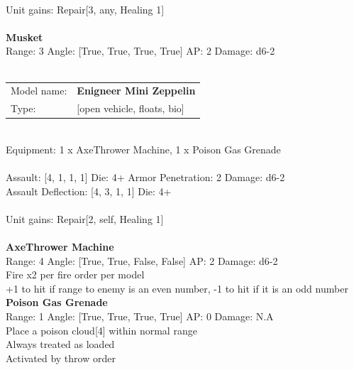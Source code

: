 \ \\
Unit gains: Repair[3, any, Healing 1]\\ 

\ \\
{\bf Musket } \\



Range: 3  Angle: [True, True, True, True] AP: 2 Damage: d6-2 \\




 
\ \\


\begin{tabular}{ll}
Model name: & {\bf Enigneer Mini Zeppelin } \\
Type: & [open vehicle, floats, bio] \\
\end{tabular}
\ \\
Equipment: 1 x AxeThrower Machine, 1 x Poison Gas Grenade \\
\ \\
Assault: [4, 1, 1, 1] Die: 4+ Armor Penetration: 2 Damage: d6-2 \\
Assault Deflection: [4, 3, 1, 1] Die: 4+\\
\indent  
\ \\
Unit gains: Repair[2, self, Healing 1]\\ 

\ \\
{\bf AxeThrower Machine } \\



Range: 4  Angle: [True, True, False, False] AP: 2 Damage: d6-2 \\
Fire x2 per fire order per model\\ 
+1 to hit if range to enemy is an even number, -1 to hit if it is an odd number\\ 




{\bf Poison Gas Grenade } \\



Range: 1  Angle: [True, True, True, True] AP: 0 Damage: N.A \\
Place a poison cloud[4] within normal range\\ 
Always treated as loaded\\ 
Activated by throw order\\ 




